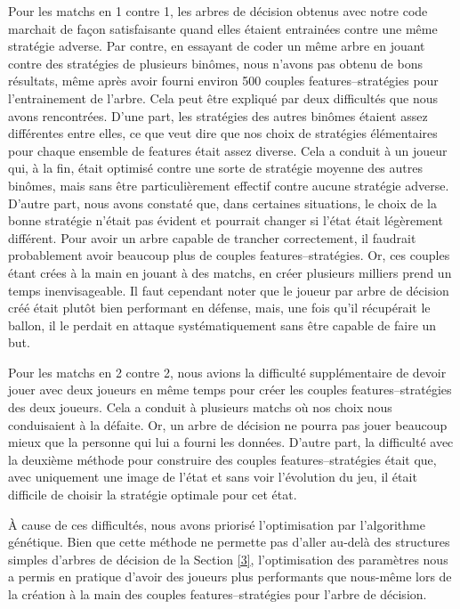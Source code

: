 \documentclass[a4paper,12pt]{article}
\begin{document}
Pour les matchs en 1 contre 1, les arbres de décision obtenus avec notre code marchait de façon satisfaisante quand elles étaient entrainées contre une même stratégie adverse. Par contre, en essayant de coder un même arbre en jouant contre des stratégies de plusieurs binômes, nous n'avons pas obtenu de bons résultats, même après avoir fourni environ 500 couples features--stratégies pour l'entrainement de l'arbre. Cela peut être expliqué par deux difficultés que nous avons rencontrées. D'une part, les stratégies des autres binômes étaient assez différentes entre elles, ce que veut dire que nos choix de stratégies élémentaires pour chaque ensemble de features était assez diverse. Cela a conduit à un joueur qui, à la fin, était optimisé contre une sorte de \og stratégie moyenne \fg{} des autres binômes, mais sans être particulièrement effectif contre aucune stratégie adverse. D'autre part, nous avons constaté que, dans certaines situations, le choix de la bonne stratégie n'était pas évident et pourrait changer si l'état était légèrement différent. Pour avoir un arbre capable de trancher correctement, il faudrait probablement avoir beaucoup plus de couples features--stratégies. Or, ces couples étant crées à la main en jouant à des matchs, en créer plusieurs milliers prend un temps inenvisageable. Il faut cependant noter que le joueur par arbre de décision créé était plutôt bien performant en défense, mais, une fois qu'il récupérait le ballon, il le perdait en attaque systématiquement sans être capable de faire un but.

Pour les matchs en 2 contre 2, nous avions la difficulté supplémentaire de devoir jouer avec deux joueurs en même temps pour créer les couples features--stratégies des deux joueurs. Cela a conduit à plusieurs matchs où nos choix nous conduisaient à la défaite. Or, un arbre de décision ne pourra pas jouer beaucoup mieux que la personne qui lui a fourni les données. D'autre part, la difficulté avec la deuxième méthode pour construire des couples features--stratégies était que, avec uniquement une image de l'état et sans voir l'évolution du jeu, il était difficile de choisir la stratégie optimale pour cet état.

À cause de ces difficultés, nous avons priorisé l'optimisation par l'algorithme génétique. Bien que cette méthode ne permette pas d'aller au-delà des structures simples d'arbres de décision de la Section \ref{3}, l'optimisation des paramètres nous a permis en pratique d'avoir des joueurs plus performants que nous-même lors de la création à la main des couples features--stratégies pour l'arbre de décision.
\end{document}

